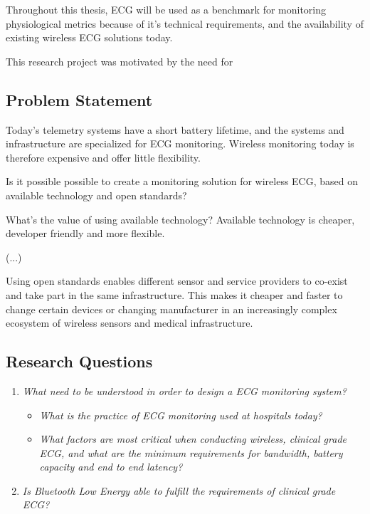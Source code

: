 Throughout this thesis, ECG will be used as a benchmark for monitoring physiological metrics because of it's technical requirements, and the availability of existing wireless ECG solutions today.

This research project was motivated by the need for 

\subsection{Problem Statement} 

\label{sub:problem_statement}

Today's telemetry systems have a short battery lifetime, and the systems and infrastructure are specialized for ECG monitoring. Wireless monitoring today is therefore expensive and offer little flexibility. 

Is it possible possible to create a monitoring solution for wireless ECG, based on available technology and open standards? 

What's the value of using available technology? Available technology is cheaper, developer friendly and more flexible.

(...)

Using open standards enables different sensor and service providers to co-exist and take part in the same infrastructure. This makes it cheaper and faster to change certain devices or changing manufacturer in an increasingly complex ecosystem of wireless sensors and medical infrastructure.

\subsection{Research Questions} 



\label{ssub:research_questions} 
\begin{enumerate}
	
	\item \textit{What need to be understood in order to design a ECG monitoring system?} 
	\begin{itemize}
		
		\item \textit{What is the practice of ECG monitoring used at hospitals today?}
		
		\item \textit{What factors are most critical when conducting wireless, clinical grade ECG, and what are the minimum requirements for bandwidth, battery capacity and end to end latency?}
	\end{itemize}
	
	\item \textit{Is Bluetooth Low Energy able to fulfill the requirements of clinical grade ECG?}
\end{enumerate}

